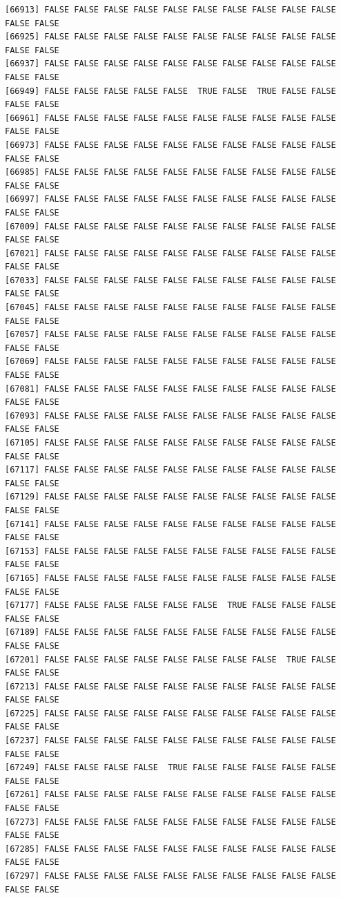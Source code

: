\documentclass[
  a4paper,
  DIV=11,
  numbers=noendperiod]{scrartcl}
\begin{document}
\begin{verbatim}
[66913] FALSE FALSE FALSE FALSE FALSE FALSE FALSE FALSE FALSE FALSE FALSE FALSE
[66925] FALSE FALSE FALSE FALSE FALSE FALSE FALSE FALSE FALSE FALSE FALSE FALSE
[66937] FALSE FALSE FALSE FALSE FALSE FALSE FALSE FALSE FALSE FALSE FALSE FALSE
[66949] FALSE FALSE FALSE FALSE FALSE  TRUE FALSE  TRUE FALSE FALSE FALSE FALSE
[66961] FALSE FALSE FALSE FALSE FALSE FALSE FALSE FALSE FALSE FALSE FALSE FALSE
[66973] FALSE FALSE FALSE FALSE FALSE FALSE FALSE FALSE FALSE FALSE FALSE FALSE
[66985] FALSE FALSE FALSE FALSE FALSE FALSE FALSE FALSE FALSE FALSE FALSE FALSE
[66997] FALSE FALSE FALSE FALSE FALSE FALSE FALSE FALSE FALSE FALSE FALSE FALSE
[67009] FALSE FALSE FALSE FALSE FALSE FALSE FALSE FALSE FALSE FALSE FALSE FALSE
[67021] FALSE FALSE FALSE FALSE FALSE FALSE FALSE FALSE FALSE FALSE FALSE FALSE
[67033] FALSE FALSE FALSE FALSE FALSE FALSE FALSE FALSE FALSE FALSE FALSE FALSE
[67045] FALSE FALSE FALSE FALSE FALSE FALSE FALSE FALSE FALSE FALSE FALSE FALSE
[67057] FALSE FALSE FALSE FALSE FALSE FALSE FALSE FALSE FALSE FALSE FALSE FALSE
[67069] FALSE FALSE FALSE FALSE FALSE FALSE FALSE FALSE FALSE FALSE FALSE FALSE
[67081] FALSE FALSE FALSE FALSE FALSE FALSE FALSE FALSE FALSE FALSE FALSE FALSE
[67093] FALSE FALSE FALSE FALSE FALSE FALSE FALSE FALSE FALSE FALSE FALSE FALSE
[67105] FALSE FALSE FALSE FALSE FALSE FALSE FALSE FALSE FALSE FALSE FALSE FALSE
[67117] FALSE FALSE FALSE FALSE FALSE FALSE FALSE FALSE FALSE FALSE FALSE FALSE
[67129] FALSE FALSE FALSE FALSE FALSE FALSE FALSE FALSE FALSE FALSE FALSE FALSE
[67141] FALSE FALSE FALSE FALSE FALSE FALSE FALSE FALSE FALSE FALSE FALSE FALSE
[67153] FALSE FALSE FALSE FALSE FALSE FALSE FALSE FALSE FALSE FALSE FALSE FALSE
[67165] FALSE FALSE FALSE FALSE FALSE FALSE FALSE FALSE FALSE FALSE FALSE FALSE
[67177] FALSE FALSE FALSE FALSE FALSE FALSE  TRUE FALSE FALSE FALSE FALSE FALSE
[67189] FALSE FALSE FALSE FALSE FALSE FALSE FALSE FALSE FALSE FALSE FALSE FALSE
[67201] FALSE FALSE FALSE FALSE FALSE FALSE FALSE FALSE  TRUE FALSE FALSE FALSE
[67213] FALSE FALSE FALSE FALSE FALSE FALSE FALSE FALSE FALSE FALSE FALSE FALSE
[67225] FALSE FALSE FALSE FALSE FALSE FALSE FALSE FALSE FALSE FALSE FALSE FALSE
[67237] FALSE FALSE FALSE FALSE FALSE FALSE FALSE FALSE FALSE FALSE FALSE FALSE
[67249] FALSE FALSE FALSE FALSE  TRUE FALSE FALSE FALSE FALSE FALSE FALSE FALSE
[67261] FALSE FALSE FALSE FALSE FALSE FALSE FALSE FALSE FALSE FALSE FALSE FALSE
[67273] FALSE FALSE FALSE FALSE FALSE FALSE FALSE FALSE FALSE FALSE FALSE FALSE
[67285] FALSE FALSE FALSE FALSE FALSE FALSE FALSE FALSE FALSE FALSE FALSE FALSE
[67297] FALSE FALSE FALSE FALSE FALSE FALSE FALSE FALSE FALSE FALSE FALSE FALSE

\end{verbatim}
\end{document}
